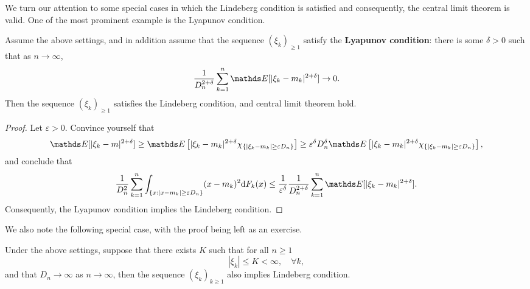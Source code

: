 We turn our attention to some special cases in which the Lindeberg condition is satisfied and consequently, the central limit theorem is valid. One of the most prominent example is the Lyapunov condition.
\begin{corollary}
Assume the above settings, and in addition assume that the sequence $(\xi_k)_{\geq 1}$ satisfy the \textbf{Lyapunov condition}: there is some $\delta > 0$ such that as $n \to \infty$,
\begin{equation}
    \frac{1}{D_n^{2 +\delta}} \sum_{k=1}^n \E[|\xi_k - m_k|^{2+\delta}] \to 0.
\end{equation}
Then the sequence $(\xi_k)_{\geq 1}$ satisfies the Lindeberg condition, and central limit theorem hold.
\end{corollary}

\begin{proof}
Let $\varepsilon > 0$. Convince yourself that
\begin{align*}
    \E[|\xi_k - m|^{2+\delta}] 
    \geq \E\sqbracket{|\xi_k - m_k|^{2+\delta} \chi_{\set{|\xi_k-m_k| \ge \varepsilon D_n}}} 
    \geq \varepsilon^\delta D_n^\delta \E\sqbracket{|\xi_k - m_k|^{2+\delta} \chi_{\set{|\xi_k-m_k| \ge \varepsilon D_n}}},
\end{align*}
and conclude that 
\begin{equation*}
    \frac{1}{D_n^2}\sum_{k=1}^n \int_{\{x: |x-m_k| \ge \varepsilon D_n\}} (x - m_k)^{2}  \d F_k(x) \le \frac{1}{\varepsilon^\delta} \frac{1}{D_n^{2 + \delta}} \sum_{k=1}^n \E[|\xi_k - m_k|^{2 + \delta}].
\end{equation*}
Consequently, the Lyapunov condition implies the Lindeberg condition.
\end{proof}

We also note the following special case, with the proof being left as an exercise.
\begin{exercise} \label{ex:Lindeberg_for_bounded_rv}
Under the above settings, suppose that there exists $K$ such that for all $n \ge 1$
\begin{equation*}
    |\xi_k| \le K < \infty, \quad \forall k,
\end{equation*}
and that $D_n \to \infty$ as $n \to \infty$, then the sequence $(\xi_k)_{k\geq 1}$ also implies Lindeberg condition.
\end{exercise}


